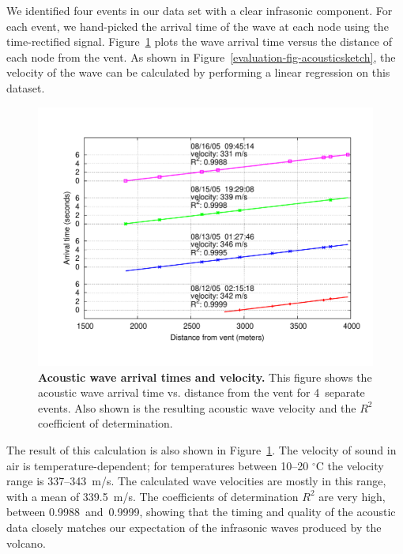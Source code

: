 We identified four events in our data set with a clear infrasonic component.
For each event, we hand-picked the arrival time of the wave at each node
using the time-rectified signal. Figure~\ref{evaluation-fig-acousticarrival}
plots the wave arrival time versus the distance of each node from the vent.
As shown in Figure~\ref{evaluation-fig-acousticsketch}, the velocity of the
wave can be calculated by performing a linear regression on this dataset.

\begin{figure}[t]
\begin{center}
\includegraphics[width=\hsize]{./3-evaluation/figs/acousticarrival.pdf}
\end{center}

\caption{\textbf{Acoustic wave arrival times and velocity.} This figure shows
the acoustic wave arrival time vs. distance from the vent for 4~separate
events. Also shown is the resulting acoustic wave velocity and the $R^2$
coefficient of determination.}

\label{evaluation-fig-acousticarrival}
\end{figure}

The result of this calculation is also shown in
Figure~\ref{evaluation-fig-acousticarrival}. The velocity of sound in air is
temperature-dependent; for temperatures between 10--20 $^{\circ}$C the
velocity range is 337--343~m/s. The calculated wave velocities are mostly in
this range, with a mean of 339.5~m/s. The coefficients of determination $R^2$
are very high, between 0.9988~and~0.9999, showing that the timing and quality
of the acoustic data closely matches our expectation of the infrasonic waves
produced by the volcano.

